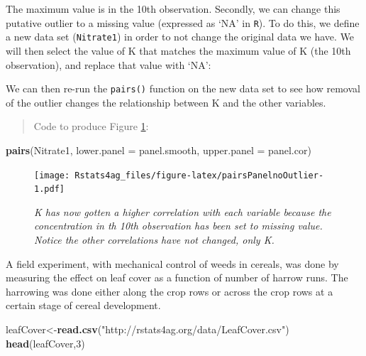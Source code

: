 \documentclass[letterpaper,]{book}
\newenvironment{Shaded}{\begin{snugshade}}{\end{snugshade}}
\newcommand{\CommentTok}[1]{\textcolor[rgb]{0.56,0.35,0.01}{\textit{#1}}}
\newcommand{\DataTypeTok}[1]{\textcolor[rgb]{0.13,0.29,0.53}{#1}}
\newcommand{\DecValTok}[1]{\textcolor[rgb]{0.00,0.00,0.81}{#1}}
\newcommand{\KeywordTok}[1]{\textcolor[rgb]{0.13,0.29,0.53}{\textbf{#1}}}
\newcommand{\NormalTok}[1]{#1}
\newcommand{\OperatorTok}[1]{\textcolor[rgb]{0.81,0.36,0.00}{\textbf{#1}}}
\newcommand{\OtherTok}[1]{\textcolor[rgb]{0.56,0.35,0.01}{#1}}
\newcommand{\StringTok}[1]{\textcolor[rgb]{0.31,0.60,0.02}{#1}}
\begin{document}
The maximum value is in the 10th observation. Secondly, we can change this putative outlier to a missing value (expressed as `NA' in \texttt{R}). To do this, we define a new data set (\texttt{Nitrate1}) in order to not change the original data we have. We will then select the value of K that matches the maximum value of K (the 10th observation), and replace that value with `NA':

\begin{Shaded}
\end{Shaded}

We can then re-run the \texttt{pairs()} function on the new data set to see how removal of the outlier changes the relationship between K and the other variables.

\begin{quote}
Code to produce Figure \ref{fig:pairsPanelnoOutlier}:
\end{quote}

\begin{Shaded}
\begin{Highlighting}[]
\KeywordTok{pairs}\NormalTok{(Nitrate1, }\DataTypeTok{lower.panel =}\NormalTok{ panel.smooth, }\DataTypeTok{upper.panel =}\NormalTok{ panel.cor)}
\end{Highlighting}
\end{Shaded}

\begin{figure}
\centering
\texttt{[image: Rstats4ag\_files/figure-latex/pairsPanelnoOutlier-1.pdf]}
\caption{\label{fig:pairsPanelnoOutlier}\emph{K has now gotten a higher correlation with each variable because the concentration in th 10th observation has been set to missing value. Notice the other correlations have not changed, only K.}}
\end{figure}

A field experiment, with mechanical control of weeds in cereals, was done by measuring the effect on leaf cover as a function of number of harrow runs. The harrowing was done either along the crop rows or across the crop rows at a certain stage of cereal development.

\begin{Shaded}
\begin{Highlighting}[]
\NormalTok{leafCover<-}\KeywordTok{read.csv}\NormalTok{(}\StringTok{"http://rstats4ag.org/data/LeafCover.csv"}\NormalTok{)}
\KeywordTok{head}\NormalTok{(leafCover,}\DecValTok{3}\NormalTok{)}
\end{Highlighting}
\end{Shaded}
\end{document}
